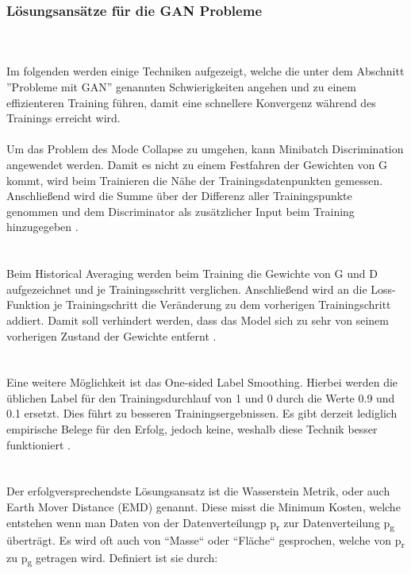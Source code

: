 \documentclass{llncs}
\begin{document}
\subsubsection{Lösungsansätze für die GAN Probleme}
~\\\\
Im folgenden werden einige Techniken aufgezeigt, welche die unter dem Abschnitt ''Probleme mit GAN'' genannten Schwierigkeiten angehen und zu einem effizienteren Training führen, damit eine schnellere Konvergenz während des Trainings erreicht wird.
~\\\\
Um das Problem des Mode Collapse zu umgehen, kann Minibatch Discrimination angewendet werden. Damit es nicht zu einem Festfahren der Gewichten von G kommt, wird beim Trainieren die Nähe der Trainingsdatenpunkten gemessen. Anschließend wird die Summe über der Differenz aller Trainingspunkte genommen und dem Discriminator als zusätzlicher Input beim Training hinzugegeben \cite{improvingan}.\\
~\\\\
Beim Historical Averaging werden beim Training die Gewichte von G und D aufgezeichnet und je Trainingsschritt verglichen. Anschließend wird an die Loss-Funktion je Trainingschritt die Veränderung zu dem vorherigen Trainingschritt addiert. Damit soll verhindert werden, dass das Model sich zu sehr von seinem vorherigen Zustand der Gewichte entfernt \cite{improvingan}.\\
~\\\\
Eine weitere Möglichkeit ist das One-sided Label Smoothing. Hierbei werden die üblichen Label für den Trainingsdurchlauf von 1 und 0 durch die Werte 0.9 und 0.1 ersetzt. Dies führt zu besseren Trainingsergebnissen. Es gibt derzeit lediglich empirische Belege für den Erfolg, jedoch keine, weshalb diese Technik besser funktioniert \cite{improvingan}.\\
~\\\\
Der erfolgversprechendste Lösungsansatz ist die Wasserstein Metrik, oder auch Earth Mover Distance (EMD) genannt. Diese misst die Minimum Kosten, welche entstehen wenn man Daten von der Datenverteilungp p\textsubscript{r} zur Datenverteilung p\textsubscript{g} überträgt. Es wird oft auch von ``Masse`` oder ``Fläche`` gesprochen, welche von p\textsubscript{r} zu p\textsubscript{g} getragen wird. Definiert ist sie durch:
\\\\
\end{document}
